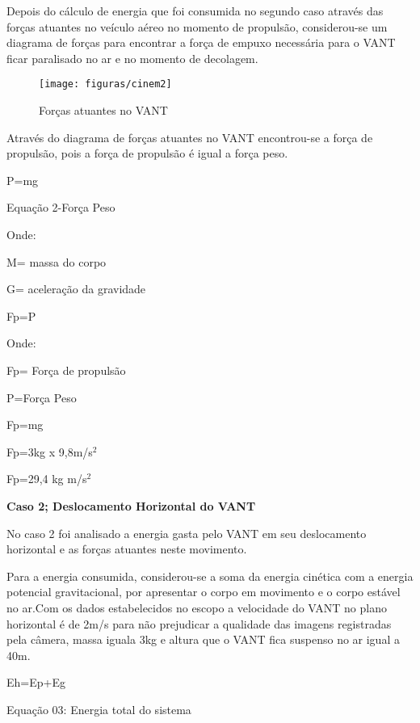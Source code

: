 Depois do cálculo de energia que foi consumida no segundo caso através das forças atuantes no veículo aéreo no momento de propulsão, considerou-se um diagrama de forças para encontrar a força de empuxo necessária para o VANT ficar paralisado no ar e no momento de decolagem.\cite{berkley1973}

\begin{figure}[H]
\centering\texttt{[image: figuras/cinem2]}
\caption{Forças atuantes no VANT}
\end{figure}

Através do diagrama de forças atuantes no VANT encontrou-se a força de propulsão, pois a força de propulsão é igual a força peso.

\begin{center}
P=mg

Equação 2-Força Peso \cite{halliday1976}
\end{center}

Onde:

M= massa do corpo

G= aceleração da gravidade

\begin{center}
Fp=P
\end{center}

Onde:

Fp= Força de propulsão

P=Força Peso

\begin{center}
Fp=mg

Fp=3kg x 9,8m/s$^{2}$

Fp=29,4 kg m/s$^{2}$
\end{center}

\textbf{Caso 2; Deslocamento Horizontal do VANT}

No caso 2 foi analisado a energia gasta pelo VANT em seu deslocamento horizontal e as forças atuantes neste movimento.

Para a energia consumida, considerou-se a soma da energia cinética com a energia potencial gravitacional, por apresentar o corpo em movimento e o corpo estável no ar.Com os dados estabelecidos no escopo a velocidade do VANT no plano horizontal é de 2m/s para não prejudicar a qualidade das imagens registradas pela câmera, massa iguala 3kg e altura que o VANT fica suspenso no ar igual a 40m.\cite{berkley1973}\cite{circuitostf2008}

\begin{center}
Eh=Ep+Eg

Equação 03: Energia total do sistema \cite{berkley1973}
\end{center}

